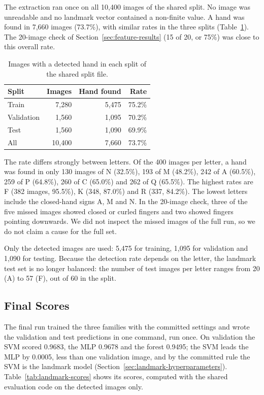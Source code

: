 The extraction ran once on all 10{,}400 images of the shared split. No image was unreadable and no landmark vector contained a non-finite value. A hand was found in 7{,}660 images (73.7\%), with similar rates in the three splits (Table~\ref{tab:landmark-detection}). The 20-image check of Section~\ref{sec:feature-results} (15 of 20, or 75\%) was close to this overall rate.

\begin{table}[htbp]
\centering
\caption{Images with a detected hand in each split of the shared split file.}
\label{tab:landmark-detection}
\begin{tabular}{lrrr}
\toprule
Split & Images & Hand found & Rate \\
\midrule
Train & 7{,}280 & 5{,}475 & 75.2\% \\
Validation & 1{,}560 & 1{,}095 & 70.2\% \\
Test & 1{,}560 & 1{,}090 & 69.9\% \\
\midrule
All & 10{,}400 & 7{,}660 & 73.7\% \\
\bottomrule
\end{tabular}
\end{table}

The rate differs strongly between letters. Of the 400 images per letter, a hand was found in only 130 images of N (32.5\%), 193 of M (48.2\%), 242 of A (60.5\%), 259 of P (64.8\%), 260 of C (65.0\%) and 262 of Q (65.5\%). The highest rates are F (382 images, 95.5\%), K (348, 87.0\%) and R (337, 84.2\%). The lowest letters include the closed-hand signs A, M and N. In the 20-image check, three of the five missed images showed closed or curled fingers and two showed fingers pointing downwards. We did not inspect the missed images of the full run, so we do not claim a cause for the full set.

Only the detected images are used: 5{,}475 for training, 1{,}095 for validation and 1{,}090 for testing. Because the detection rate depends on the letter, the landmark test set is no longer balanced: the number of test images per letter ranges from 20 (A) to 57 (F), out of 60 in the split.

\subsection{Final Scores}

The final run trained the three families with the committed settings and wrote the validation and test predictions in one command, run once. On validation the SVM scored 0.9683, the MLP 0.9678 and the forest 0.9495; the SVM leads the MLP by 0.0005, less than one validation image, and by the committed rule the SVM is the landmark model (Section~\ref{sec:landmark-hyperparameters}). Table~\ref{tab:landmark-scores} shows its scores, computed with the shared evaluation code on the detected images only.

